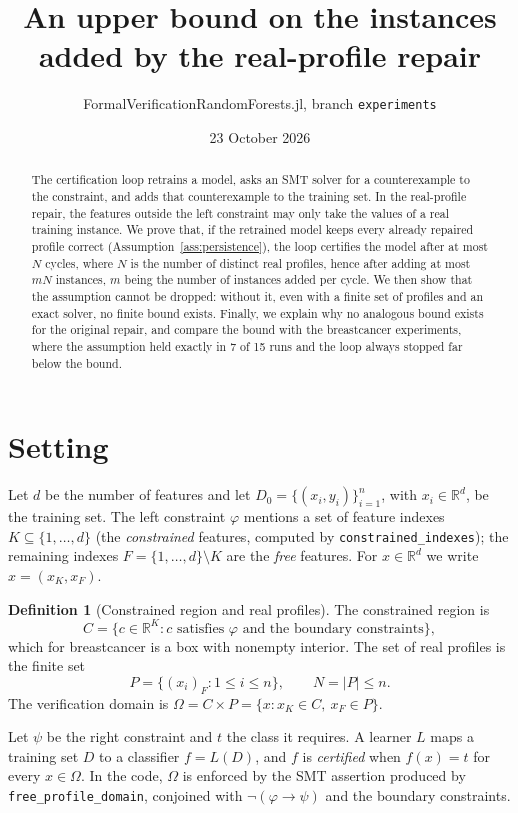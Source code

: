 \documentclass[11pt]{article}
\title{An upper bound on the instances added by the real-profile repair}
\author{FormalVerificationRandomForests.jl, branch \texttt{experiments}}
\date{23 October 2026}
\theoremstyle{definition}
\newtheorem{definition}[theorem]{Definition}
\theoremstyle{remark}
\newcommand{\R}{\mathbb{R}}
\newcommand{\Dom}{\Omega}
\begin{document}
\maketitle

\begin{abstract}
The certification loop retrains a model, asks an SMT solver for a counterexample to the
constraint, and adds that counterexample to the training set.
In the real-profile repair, the features outside the left constraint may only take the
values of a real training instance.
We prove that, if the retrained model keeps every already repaired profile correct
(Assumption~\ref{ass:persistence}), the loop certifies the model after at most $N$
cycles, where $N$ is the number of distinct real profiles, hence after adding at most
$mN$ instances, $m$ being the number of instances added per cycle.
We then show that the assumption cannot be dropped: without it, even with a finite set of
profiles and an exact solver, no finite bound exists.
Finally, we explain why no analogous bound exists for the original repair, and compare the
bound with the breastcancer experiments, where the assumption held exactly in 7 of 15 runs
and the loop always stopped far below the bound.
\end{abstract}

\section{Setting}

Let $d$ be the number of features and let $D_0=\{(x_i,y_i)\}_{i=1}^{n}$, with
$x_i\in\R^d$, be the training set.
The left constraint $\varphi$ mentions a set of feature indexes $K\subseteq\{1,\dots,d\}$
(the \emph{constrained} features, computed by \texttt{constrained\_indexes}); the remaining
indexes $F=\{1,\dots,d\}\setminus K$ are the \emph{free} features.
For $x\in\R^d$ we write $x=(x_K,x_F)$.

\begin{definition}[Constrained region and real profiles]
The constrained region is
\[
  C=\{c\in\R^{K} : c \text{ satisfies } \varphi \text{ and the boundary constraints}\},
\]
which for breastcancer is a box with nonempty interior.
The set of real profiles is the finite set
\[
  P=\{(x_i)_F : 1\le i\le n\},\qquad N=|P|\le n .
\]
The verification domain is $\Dom=C\times P=\{x : x_K\in C,\ x_F\in P\}$.
\end{definition}

Let $\psi$ be the right constraint and $t$ the class it requires.
A learner $L$ maps a training set $D$ to a classifier $f=L(D)$, and $f$ is
\emph{certified} when $f(x)=t$ for every $x\in\Dom$.
In the code, $\Dom$ is enforced by the SMT assertion produced by
\texttt{free\_profile\_domain}, conjoined with $\neg(\varphi\to\psi)$ and the boundary
constraints.
\end{document}
